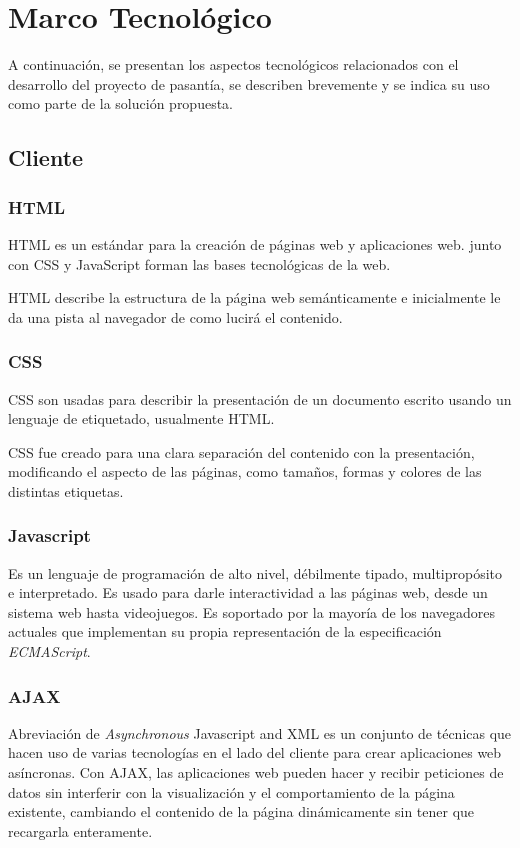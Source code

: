 \chapter{Marco Tecnológico}
\thispagestyle{empty} %

A continuación, se presentan los aspectos tecnológicos relacionados con el desarrollo del proyecto de pasantía, se describen brevemente y se indica su uso como parte de la solución propuesta.

\section{Cliente}

\subsection{HTML}

\gls{HTML} es un estándar para la creación de páginas web y aplicaciones web. junto con \gls{CSS} y JavaScript forman las bases tecnológicas de la web.

HTML describe la estructura de la página web semánticamente e inicialmente le da una pista al navegador de como lucirá el contenido.


\subsection{CSS}
\gls{CSS} son usadas para describir la presentación de un documento escrito usando un lenguaje de etiquetado, usualmente \gls{HTML}. 

\gls{CSS} fue creado para una clara separación del contenido con la presentación, modificando el aspecto de las páginas, como tamaños, formas y colores de las distintas etiquetas.

\subsection{Javascript}
Es un lenguaje de programación de alto nivel, débilmente tipado, multipropósito e interpretado. Es usado para darle interactividad a las páginas web, desde un sistema web hasta videojuegos. Es soportado por la mayoría de los navegadores actuales que implementan su propia representación de la especificación \emph{ECMAScript}.

\subsection{AJAX}
Abreviación de \emph{Asynchronous} Javascript and \gls{XML} es un conjunto de técnicas que hacen uso de varias tecnologías en el lado del cliente para crear aplicaciones web asíncronas. Con \gls{AJAX}, las aplicaciones web pueden hacer y recibir peticiones de datos sin interferir con la visualización y el comportamiento de la página existente, cambiando el contenido de la página dinámicamente sin tener que recargarla enteramente.

